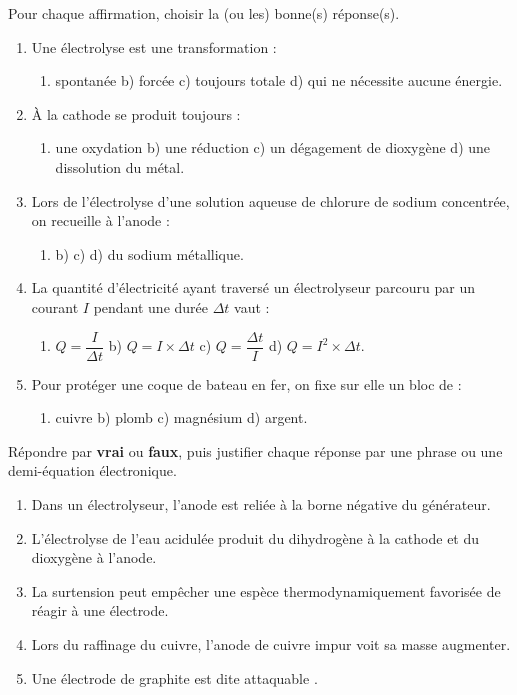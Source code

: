 \documentclass[11pt]{article}
\begin{document}
\begin{exercice}
Pour chaque affirmation, choisir la (ou les) bonne(s) réponse(s).
\begin{enumerate}
\item Une électrolyse est une transformation :
\begin{enumerate}
\item spontanée \quad b) forcée \quad c) toujours totale \quad d) qui ne nécessite aucune énergie.
\end{enumerate}
\item À la cathode se produit toujours :
\begin{enumerate}
\item une oxydation \quad b) une réduction \quad c) un dégagement de dioxygène \quad d) une dissolution du métal.
\end{enumerate}
\item Lors de l'électrolyse d'une solution aqueuse de chlorure de sodium concentrée, on recueille à l'anode :
\begin{enumerate}
\item {} \quad b)  \quad c)  \quad d) du sodium métallique.
\end{enumerate}
\item La quantité d'électricité ayant traversé un électrolyseur parcouru par un courant $I$ pendant une durée $\Delta t$ vaut :
\begin{enumerate}
\item $Q = \dfrac{I}{\Delta t}$ \quad b) $Q = I \times \Delta t$ \quad c) $Q = \dfrac{\Delta t}{I}$ \quad d) $Q = I^2 \times \Delta t$.
\end{enumerate}
\item Pour protéger une coque de bateau en fer, on fixe sur elle un bloc de :
\begin{enumerate}
\item cuivre \quad b) plomb \quad c) magnésium \quad d) argent.
\end{enumerate}
\end{enumerate}
\end{exercice}

\begin{exercice}
Répondre par \textbf{vrai} ou \textbf{faux}, puis justifier chaque réponse par une phrase ou une demi-équation électronique.
\begin{enumerate}
\item Dans un électrolyseur, l'anode est reliée à la borne négative du générateur.
\item L'électrolyse de l'eau acidulée produit du dihydrogène à la cathode et du dioxygène à l'anode.
\item La surtension peut empêcher une espèce thermodynamiquement favorisée de réagir à une électrode.
\item Lors du raffinage du cuivre, l'anode de cuivre impur voit sa masse augmenter.
\item Une électrode de graphite est dite \og attaquable \fg.
\end{enumerate}
\end{exercice}
\end{document}
